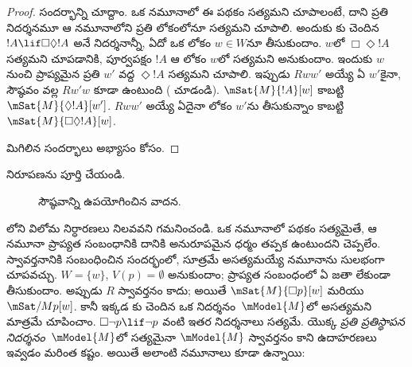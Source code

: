 \documentclass[../../../include/open-logic-section]{subfiles}
\begin{document}
\begin{proof}
   సందర్భాన్ని చూద్దాం. ఒక నమూనాలో ఈ పథకం
  సత్యమని చూపాలంటే, దాని ప్రతి నిదర్శనమూ ఆ నమూనాలోని
  ప్రతి లోకంలోనూ సత్యమని చూపాలి. అందుకు కు చెందిన
  $!A \lif \Box\Diamond !A$ అనే నిదర్శనాన్నీ,
  ఏదో ఒక లోకం $w \in W$నూ తీసుకుందాం.
  $w$లో $\Box \Diamond !A$ సత్యమని చూపడానికి,
  పూర్వపక్షం $!A$ ఆ లోకం $w$లో సత్యమని అనుకుందాం.
  ఇందుకు $w$ నుంచి ప్రాప్యమైన ప్రతి $w'$ వద్ద
  $\Diamond !A$ సత్యమని చూపాలి. ఇప్పుడు $Rww'$
  అయ్యే ఏ $w'$కైనా, సౌష్ఠవం వల్ల $Rw'w$ కూడా
  ఉంటుంది ( చూడండి). $\mSat{M}{!A}[w]$
  కాబట్టి $\mSat{M}{\Diamond !A}[w']$.
  $Rww'$ అయ్యే ఏదైనా లోకం $w'$ను తీసుకున్నాం కాబట్టి
  $\mSat{M}{\Box\Diamond!A}[w]$.

  మిగిలిన సందర్భాలు అభ్యాసం కోసం.
\end{proof}

\begin{prob}
   నిరూపణను పూర్తి చేయండి.
\end{prob}

\begin{figure}
  \begin{center}
  \end{center}
\caption{సౌష్ఠవాన్ని ఉపయోగించిన వాదన.}
\end{figure}

లోని విలోమ నిర్ధారణలు నిలవవని గమనించండి.
ఒక నమూనాలో పథకం సత్యమైతే, ఆ నమూనా ప్రాప్యత సంబంధానికి
దానికి అనురూపమైన ధర్మం తప్పక ఉంటుందని చెప్పలేం.
స్వావర్తనానికి సంబంధించిన  సందర్భంలో, 
సూత్రమే అసత్యమయ్యే నమూనాను సులభంగా చూపవచ్చు.
$W = \{w\}$, $V(p) = \emptyset$ అనుకుందాం;
ప్రాప్యత సంబంధంలో ఏ జతా లేకుండా తీసుకుందాం.
అప్పుడు $R$ స్వావర్తనం కాదు; అయితే $\mSat{M}{\Box
  p}[w]$ మరియు $\mSat/{M}{p}[w]$. కానీ ఇక్కడ
కు చెందిన ఒక నిదర్శనం~$\mModel{M}$లో
అసత్యమని మాత్రమే చూపించాం. $\Box \lnot p \lif \lnot p$ వంటి ఇతర
నిదర్శనాలు సత్యమే.  యొక్క \emph{ప్రతి ప్రతిస్థాపన
నిదర్శనం}~$\mModel{M}$లో సత్యమైనా $\mModel{M}$
స్వావర్తనం కాని ఉదాహరణలు ఇవ్వడం మరింత కష్టం.
అయితే అలాంటి నమూనాలు కూడా ఉన్నాయి:
\end{document}
